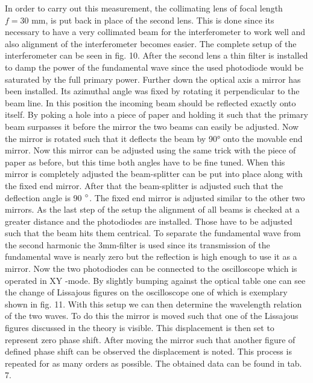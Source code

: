 In order to carry out this measurement, the collimating lens of focal length $f=30$ mm, is put back in place of the second lens. This is done since its necessary to have a very collimated beam for the interferometer to work well and also alignment of the interferometer becomes easier. The complete setup of the interferometer can be seen in fig. 10. After the second lens a thin filter is installed to damp the power of the fundamental wave since the used photodiode would be saturated by the full primary power. Further down the optical axis a mirror has been installed. Its azimuthal angle was fixed by rotating it perpendicular to the beam line. In this position the incoming beam should be reflected exactly onto itself. By poking a hole into a piece of paper and holding it such that the primary beam surpasses it before the mirror the two beams can easily be adjusted. Now the mirror is rotated such that it deflects the beam by 90° onto the movable end mirror. Now this mirror can be adjusted using the
same trick with the piece of paper as before, but this time both angles have to be fine tuned. When this mirror is completely adjusted the beam-splitter can be put into place along with the fixed end mirror. After that the beam-splitter is adjusted such that the deflection angle is 90 $\degree$. The fixed end mirror is adjusted similar to the other two mirrors. As the last step of the setup the alignment of all beams is checked at a greater distance and the photodiodes are installed.
Those have to be adjusted such that the beam hits them centrical. To separate the fundamental wave from the second harmonic the 3mm-filter is used since its transmission of the fundamental wave is nearly zero but the reflection is high enough to use it as a mirror. Now the two photodiodes can be connected to the oscilloscope which is operated
in XY -mode. By slightly bumping against the optical table one can see the change of Lissajous figures on the oscilloscope one of which is exemplary shown
in fig. 11. With this setup we can then determine the wavelength relation of the two waves. To do this the mirror is moved such that one of the Lissajous figures discussed in the theory is visible. This displacement is then set to represent zero phase shift. After moving the mirror such that another figure of defined phase shift can be observed the displacement is noted. This process is repeated for as many orders as possible. The obtained data can be found in tab. 7.

